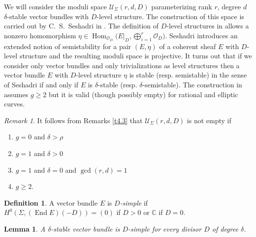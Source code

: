 \documentclass[12pt,a4paper,oneside,english]{smfart}
\newtheorem{lem}[thm]{Lemma}
\theoremstyle{definition}
\newtheorem{defn}[thm]{Definition}
\theoremstyle{remark}
\newtheorem{rem}[thm]{Remark}
\DeclareMathOperator{\End}{End}
\DeclareMathOperator{\Hom}{Hom}
\newcommand{\cU}{\mathcal{U}}
\newcommand{\cO}{\mathcal{O}}
\begin{document}
We will consider the moduli space $\cU_\Sigma(r, d, D)$ parameterizing rank $r$, degree $d$ $\delta$-stable vector bundles with $D$-level structure. The construction of this space is carried out by C.~S.~Seshadri in \cite{Se}. The definition of $D$-level structures in \cite{Se} allows a nonzero homomorphism $\eta \in \Hom_{\cO_D}\bigl(E|_D, \bigoplus_{i=1}^{r} \cO_D\bigr)$. Seshadri introduces an extended notion of semistability for a pair $(E, \eta)$ of a coherent sheaf $E$ with $D$-level structure and the resulting moduli space is projective. It turns out that if we consider only vector bundles and only trivializations as level structures then a vector bundle $E$ with $D$-level structure $\eta$ is stable (resp. semistable) in the sense of Seshadri if and only if $E$ is $\delta$-stable (resp. $\delta$-semistable). The construction in \cite{Se} assumes $g \geqslant 2$ but it is valid (though possibly empty) for rational and elliptic curves.

\begin{rem}\label{t4.4}
It follows from Remarks \ref{t4.3} that $\cU_\Sigma(r, d, D)$ is not empty if
\begin{enumerate}
    \item $g = 0$ and $\delta > \rho$
    \item $g = 1$ and $\delta > 0$
    \item $g = 1$ and $\delta = 0$ and $\gcd(r, d) = 1$
    \item $g \geqslant 2$.
\end{enumerate}
\end{rem}

\begin{defn}\label{t4.5}
A vector bundle $E$ is \emph{$D$-simple} if $H^0(\Sigma, (\End E)(-D)) = (0)$ if $D > 0$ or $\mathbb{C}$ if $D = 0$.
\end{defn}

\begin{lem}\label{t4.6}
A $\delta$-stable vector bundle is $D$-simple for every divisor $D$ of degree $\delta$.
\end{lem}
\end{document}
